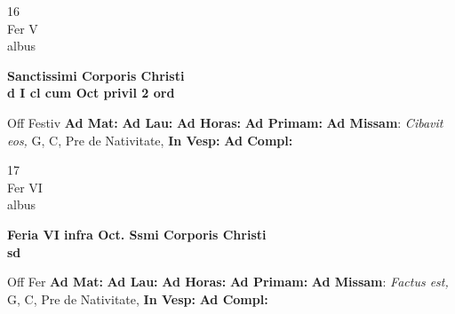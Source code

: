 \documentclass[10pt, openany]{book}
\begin{document}
    \begin{center}
        \begin{minipage}{3.5in}
            \vspace{2em}
            \begin{minipage}{0.5in}
                {\Huge 16} \\
                {\normalsize Fer V} \\
                {\normalsize albus}
            \end{minipage}
            \begin{minipage}{3.0in}
                \textbf{ \large Sanctissimi Corporis Christi \\
                \textnormal{\normalsize d I cl cum Oct privil 2 ord}} \\ 
            \end{minipage}
            \begin{justify}Off Festiv
                \textbf{Ad Mat: }
                \textbf{Ad Lau: }
                \textbf{Ad Horas: }
                \textbf{Ad Primam: }\textbf{Ad Missam}: \textit{Cibavit eos,} G, C, Pre de Nativitate,  
                \textbf{In Vesp: }
                \textbf{Ad Compl: }
            \end{justify}
        \end{minipage}
    \end{center}

    \begin{center}
        \begin{minipage}{3.5in}
            \vspace{2em}
            \begin{minipage}{0.5in}
                {\Huge 17} \\
                {\normalsize Fer VI} \\
                {\normalsize albus}
            \end{minipage}
            \begin{minipage}{3.0in}
                \textbf{ \large Feria VI infra Oct. Ssmi Corporis Christi \\
                \textnormal{\normalsize sd}} \\ 
            \end{minipage}
            \begin{justify}Off Fer
                \textbf{Ad Mat: }
                \textbf{Ad Lau: }
                \textbf{Ad Horas: }
                \textbf{Ad Primam: }\textbf{Ad Missam}: \textit{Factus est,} G, C, Pre de Nativitate,  
                \textbf{In Vesp: }
                \textbf{Ad Compl: }
            \end{justify}
        \end{minipage}
    \end{center}
\end{document}
